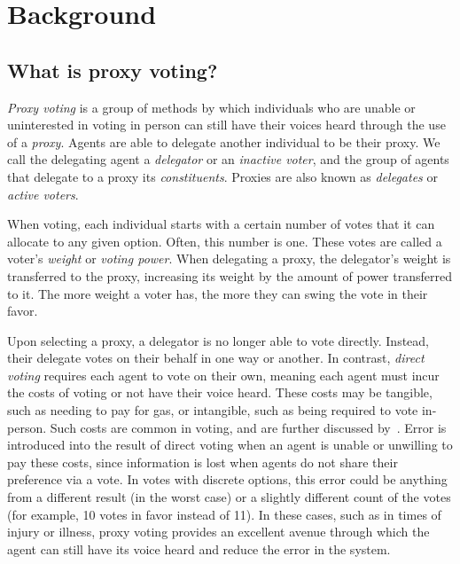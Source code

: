 \section{Background}\label{sec:background}  %

\subsection{What is proxy voting?}\label{subsec:what-is-proxy-voting?}
\textit{Proxy voting} is a group of methods by which individuals who are unable or
uninterested in voting in person can still have their voices heard through the use of
a \textit{proxy}.
Agents are able to delegate another individual to be their proxy.
We call the delegating agent a \textit{delegator} or an \textit{inactive voter}, and
the group of agents that delegate to a proxy its \textit{constituents}.
Proxies are also known as \textit{delegates} or \textit{active voters}.

When voting, each individual starts with a certain number of votes that it can
allocate to any given option.
Often, this number is one.
These votes are called a voter's \textit{weight} or \textit{voting power}.
When delegating a proxy, the delegator's weight is transferred to the proxy,
increasing its weight by the amount of power transferred to it.
The more weight a voter has, the more they can swing the vote in their favor.

Upon selecting a proxy, a delegator is no longer able to vote directly.
Instead, their delegate votes on their behalf in one way or another.
In contrast, \textit{direct voting} requires each agent to vote on their own, meaning
each agent must incur the costs of voting or not have their voice heard.
These costs may be tangible, such as needing to pay for gas, or intangible, such as
being required to vote in-person.
Such costs are common in voting, and are further discussed by~\cite{Gershtein2019}.
Error is introduced into the result of direct voting when an agent is unable or
unwilling to pay these costs, since information is lost when agents do not share
their preference via a vote.
In votes with discrete options, this error could be anything from a different result
(in the worst case) or a slightly different count of the votes (for example, 10
votes in favor instead of 11).
In these cases, such as in times of injury or illness, proxy voting provides an
excellent avenue through which the agent can still have its voice heard and reduce
the error in the system.

